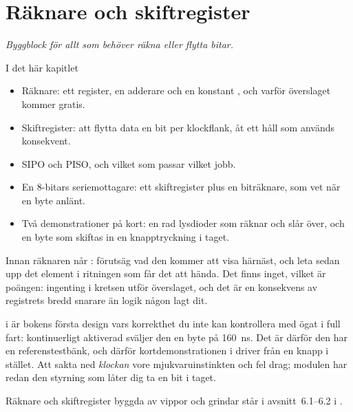 
\chapter{Räknare och skiftregister}
\label{c6:ch}

{\large\itshape Byggblock för allt som behöver räkna eller flytta bitar.\par}

\begin{chapterbox}{I det här kapitlet}
\begin{itemize}
  \item Räknare: ett register, en adderare och en konstant , och varför överslaget kommer
    gratis.
  \item Skiftregister: att flytta data en bit per klockflank, åt ett håll som används konsekvent.
  \item SIPO och PISO, och vilket som passar vilket jobb.
  \item En 8-bitars seriemottagare: ett skiftregister plus en biträknare, som vet när en byte
    anlänt.
  \item Två demonstrationer på kort: en rad lysdioder som räknar och slår över, och en byte som
    skiftas in en knapptryckning i taget.
\end{itemize}
\end{chapterbox}

Innan räknaren når : förutsäg vad den kommer att visa härnäst, och leta sedan upp det
element i ritningen som får det att hända. Det finns inget, vilket är poängen: ingenting i kretsen
utför överslaget, och det är en konsekvens av registrets bredd snarare än logik någon lagt dit.

 i  är bokens första design vars korrekthet du inte kan
kontrollera med ögat i full fart: kontinuerligt aktiverad sväljer den en byte på 160~ns. Det är
därför den har en referenstestbänk, och därför kortdemonstrationen i 
driver  från en knapp i stället. Att sakta ned \emph{klockan} vore
mjukvaruinstinkten och fel drag; modulen har redan den styrning som låter dig ta en bit i taget.

\note[Repetition] Räknare och skiftregister byggda av vippor och grindar står i avsnitt~6.1--6.2 i
\debook{}.




